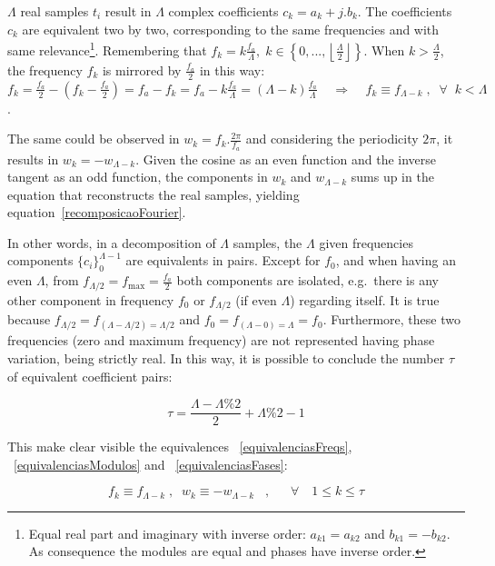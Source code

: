 \documentclass[
 aip,
 jmp,
 amsmath,amssymb,
 reprint,
]{revtex4-1}
\begin{document}
$\Lambda$ real samples $t_i$ result in $\Lambda$ complex coefficients $c_k=a_k+j.b_k$. The coefficients $c_k$ are equivalent two by two, corresponding to the same frequencies and with same relevance\footnote{Equal real part and imaginary with inverse order: $a_{k1}=a_{k2}$ and $b_{k1}=-b_{k2}$. As consequence the modules are equal and phases have inverse order.}. Remembering that $f_k = k\frac{f_a}{\Lambda}, \; k \in \left\{0, ..., \left \lfloor \frac{\Lambda}{2} \right \rfloor \right\} $. When $k > \frac{\Lambda}{2}$, the frequency $f_k$ is mirrored by $\frac{f_a}{2}$ in this way: $f_k=\frac{f_a}{2} - (f_k-\frac{f_a}{2})=f_a-f_k=f_a - k\frac{f_a}{\Lambda}=(\Lambda-k)\frac{f_a}{\Lambda} \;\;\;\; \Rightarrow \;\;\;\; f_k\equiv f_{\Lambda-k} \; ,\;\; \forall \;\; k<\Lambda$. 

The same could be observed in $w_k=f_k.\frac{2\pi}{f_a}$ and considering the periodicity $2\pi$, it results in $w_k=-w_{\Lambda-k}$. Given the cosine as an even function and the inverse tangent as an odd function, the components in $w_k$ and $w_{\Lambda-k}$ sums up in the equation that reconstructs the real samples, yielding equation~\ref{recomposicaoFourier}.

In other words, in a decomposition of $\Lambda$ samples, the $\Lambda$ given frequencies components $\{c_i\}_0^{\Lambda-1}$ are equivalents in pairs.
Except for $f_0$, and when having an even $\Lambda$, from $f_{\Lambda/2}=f_{\text{max}}=\frac{f_a}{2}$ both components are isolated, e.g.\ there is any other component in frequency $f_0$ or $f_{\Lambda/2}$ (if even $\Lambda$) regarding itself. 
It is true because $f_{\Lambda/2}=f_{(\Lambda-\Lambda/2) = \Lambda/2}$ and $f_0=f_{(\Lambda-0)=\Lambda}=f_0$.
Furthermore, these two frequencies (zero and maximum frequency) are not represented having phase variation, being strictly real. In this way, it is possible to conclude the number $\tau$ of equivalent coefficient pairs:

\begin{equation}\label{coefsPareados}
\tau = \frac{\Lambda - \Lambda \% 2}{2} +\Lambda \% 2 -1
\end{equation}

This make clear visible the equivalences ~\ref{equivalenciasFreqs}, ~\ref{equivalenciasModulos} and ~\ref{equivalenciasFases}:

\begin{equation}\label{equivalenciasFreqs}
f_{k}\equiv f_{\Lambda-k}\;, \;\; w_{k}\equiv-w_{\Lambda-k}\;\;\;, \quad \;\; \forall \quad 1 \leq k \leq \tau  
\end{equation}
\end{document}
